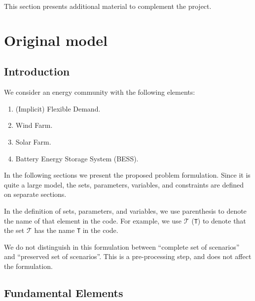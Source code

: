 This section presents additional material to complement the project.

\section{Original model}

\subsection{Introduction}

We consider an energy community with the following elements:
\begin{enumerate}
	\item (Implicit) Flexible Demand.
	\item Wind Farm.
	\item Solar Farm.
	\item Battery Energy Storage System (BESS).
\end{enumerate}

In the following sections we present the proposed problem formulation. Since it is quite a large model,
the sets, parameters, variables, and constraints are defined on separate sections.

\begin{notation}
	In the definition of sets, parameters, and variables, we use parenthesis to denote the name of that element in the code. For example, we use $\mathcal{T}$ (\verb|T|) to denote that the set $\mathcal{T}$ has the name \verb|T| in the code.  
\end{notation}

\begin{note} \label{NOTE:ScenarioTreatment}
	We do not distinguish in this formulation between ``complete set of scenarios'' and ``preserved set of scenarios''. This is a pre-processing step, and does not affect the formulation. 
\end{note}

\subsection{Fundamental Elements}
\label{SEC:FundamentalElements}

